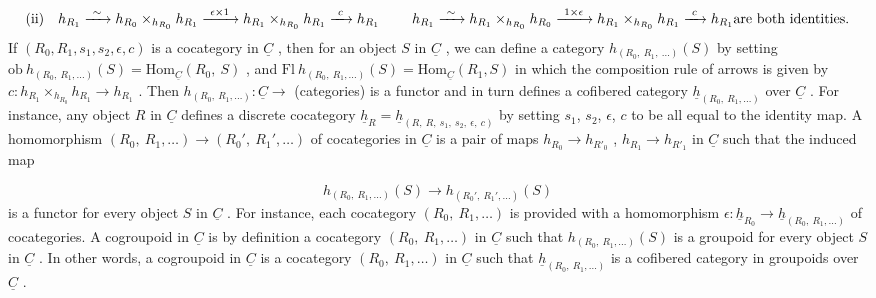 \begin{equation*}
(\mathrm{ii}) \quad h_{R_1} \xrightarrow{\ \sim\ } h_{R_0} \times_{h_{R_0}} h_{R_1} \xrightarrow{\ \epsilon \times 1\ } h_{R_1} \times_{h_{R_0}} h_{R_1} \xrightarrow{\ c\ } h_{R_1}
\\[2ex]
\phantom{(\mathrm{ii})} \quad h_{R_1} \xrightarrow{\ \sim\ } h_{R_1} \times_{h_{R_0}} h_{R_0} \xrightarrow{\ 1 \times \epsilon\ } h_{R_1} \times_{h_{R_0}} h_{R_1} \xrightarrow{\ c\ } h_{R_1}
\\[1ex]
\text{are both identities.}
\end{equation*}
If  $(R_0, R_1, s_1, s_2, \epsilon, c)$  is a cocategory in $\underline{C}$ , then for an object $S$ in $\underline{C}$ , we can define a category  $h_{(R_0,\ R_1,\ \ldots)}(S)$  by setting  $\mathrm{ob}\ h_{(R_0,\ R_1,\ldots)}(S) = \mathrm{Hom}_{\underline{C}}(R_0,\ S)$ , and  $\mathrm{Fl}\ h_{(R_0,\ R_1,\ldots)}(S) = \mathrm{Hom}_{\underline{C}}(R_1,S)$  in which the composition rule of arrows is given by  $c : h_{R_1} \times_{h_{R_0}} h_{R_1} \to h_{R_1}$ . Then $h_{(R_0,\ R_1,\ldots)} : \underline{C} \to$ (categories)  is a functor and in turn defines a cofibered category $\underline{h}_{(R_0,\ R_1,\ldots)}$ over $\underline{C}$ . For instance, any object $R$ in $\underline{C}$ defines a discrete cocategory $\underline{h}_R = \underline{h}_{(R,\ R,\ s_1,\ s_2,\ \epsilon,\ c)}$ by setting $s_1$, $s_2$, $\epsilon$, $c$ to be all equal to the identity map. A homomorphism  $(R_0,\ R_1,\ldots) \to (R_0{}',\ R_1{}',\ldots)$
of cocategories in $\underline{C}$ is a pair of maps $h_{R_0} \to h_{R'_0}$ , $h_{R_1} \to h_{R'_1}$ in $\underline{C}$ such that the induced map

\begin{equation*}
h_{(R_0,\ R_1,\ldots)}(S) \to h_{(R_0',\ R_1',\ldots)}(S)
\end{equation*}
is a functor for every object $S$ in $\underline{C}$ . For instance, each cocategory $(R_0,\ R_1,\ldots)$ is provided with a homomorphism $\epsilon : \underline{h}_{R_0} \to \underline{h}_{(R_0,\ R_1,\ldots)}$ of cocategories. A cogroupoid in $\underline{C}$ is by definition a cocategory $(R_0,\ R_1,\ldots)$ in $\underline{C}$ such that $h_{(R_0,\ R_1,\ldots)}(S)$ is a groupoid for every object $S$ in $\underline{C}$ . In other words, a cogroupoid in $\underline{C}$ is a cocategory $(R_0,\ R_1,\ldots)$ in $\underline{C}$ such that $\underline{h}_{(R_0,\ R_1,\ldots)}$ is a cofibered category in groupoids over $\underline{C}$ .

